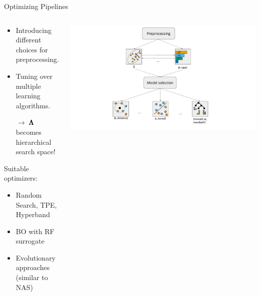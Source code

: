 \begin{frame}{Optimizing Pipelines}

  \begin{columns}
    \begin{column}{0.6\textwidth}
      \vspace*{-0.5em}
      \begin{itemize}
        \item Introducing different choices for preprocessing.
        \item Tuning over multiple learning algorithms.
        \item[$\rightarrow$] $\pmb{\Lambda}$ becomes hierarchical search space!
      \end{itemize}
      
      \vspace*{0.5em}

      Suitable optimizers:
      \begin{itemize}
        \item Random Search, TPE, Hyperband
        \item BO with RF surrogate
        \item Evolutionary approaches (similar to NAS)
      \end{itemize}

    \end{column}%
    \begin{column}{0.4\textwidth}
      \begin{center}
        \includegraphics[width = \textwidth, trim=160 0 160 5, clip]{images/dag.pdf}
      \end{center}
    \end{column}
  \end{columns}
\end{frame}

